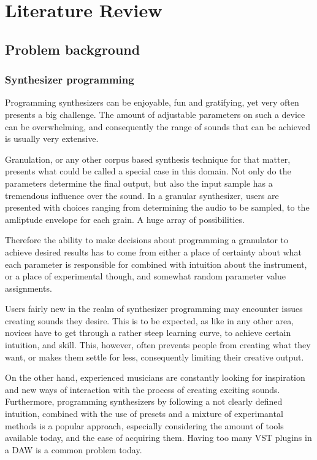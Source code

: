 \chapter{Literature Review}
\label{chap:lit}

\section{Problem background}

\subsection{Synthesizer programming}

Programming synthesizers can be enjoyable, fun and gratifying, yet
very often presents a big challenge. The amount of adjustable
parameters on such a device can be overwhelming, and consequently the
range of sounds that can be achieved is usually very extensive.

Granulation, or any other corpus based synthesis technique for that
matter, presents what could be called a special case in this
domain. Not only do the parameters determine the final output, but
also the input sample has a tremendous influence over the sound. In a
granular synthesizer, users are presented with choices ranging from
determining the audio to be sampled, to the amliptude envelope for
each grain. A huge array of possibilities.

Therefore the ability to make decisions about programming a granulator
to achieve desired results has to come from either a place of
certainty about what each parameter is responsible for combined with
intuition about the instrument, or a place of experimental though, and
somewhat random parameter value assignments.

Users fairly new in the realm of synthesizer programming may encounter
issues creating sounds they desire. This is to be expected, as like in
any other area, novices have to get through a rather steep learning
curve, to achieve certain intuition, and skill. This, however, often
prevents people from creating what they want, or makes them settle for
less, consequently limiting their creative output.

On the other hand, experienced musicians are constantly looking for
inspiration and new ways of interaction with the process of creating
exciting sounds\cite{herbert_manifesto_2011}. Furthermore, programming
synthesizers by following a not clearly defined intuition, combined
with the use of presets and a mixture of experimantal methods is a
popular approach\cite{noauthor_oneohtrix_2016}, especially considering
the amount of tools available today, and the ease of acquiring
them. Having too many VST plugins in a DAW is a common problem today.

